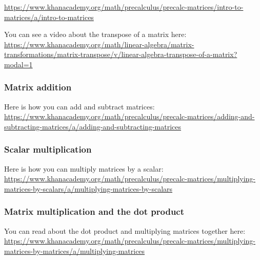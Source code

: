 \documentclass[11pt]{article}
\begin{document}
\href{https://www.khanacademy.org/math/precalculus/precalc-matrices/intro-to-matrices/a/intro-to-matrices}{https://www.khanacademy.org/math/precalculus/precalc-matrices/intro-to-matrices/a/intro-to-matrices}

You can see a video about the transpose of a matrix here: \\
\href{https://www.khanacademy.org/math/linear-algebra/matrix-transformations/matrix-transpose/v/linear-algebra-transpose-of-a-matrix?modal=1}{https://www.khanacademy.org/math/linear-algebra/matrix-transformations/matrix-transpose/v/linear-algebra-transpose-of-a-matrix?modal=1}


\subsubsection{Matrix addition}

Here is how you can add and subtract matrices: \\

\href{https://www.khanacademy.org/math/precalculus/precalc-matrices/adding-and-subtracting-matrices/a/adding-and-subtracting-matrices}{https://www.khanacademy.org/math/precalculus/precalc-matrices/adding-and-subtracting-matrices/a/adding-and-subtracting-matrices}

\subsubsection{Scalar multiplication}

Here is how you can multiply matrices by a scalar:\\

 \href{https://www.khanacademy.org/math/precalculus/precalc-matrices/multiplying-matrices-by-scalars/a/multiplying-matrices-by-scalars}{https://www.khanacademy.org/math/precalculus/precalc-matrices/multiplying-matrices-by-scalars/a/multiplying-matrices-by-scalars}

\subsubsection{Matrix multiplication and the dot product}

You can read about the dot product and multiplying matrices together here: \\

\href{https://www.khanacademy.org/math/precalculus/precalc-matrices/multiplying-matrices-by-matrices/a/multiplying-matrices}{https://www.khanacademy.org/math/precalculus/precalc-matrices/multiplying-matrices-by-matrices/a/multiplying-matrices}
\end{document}
